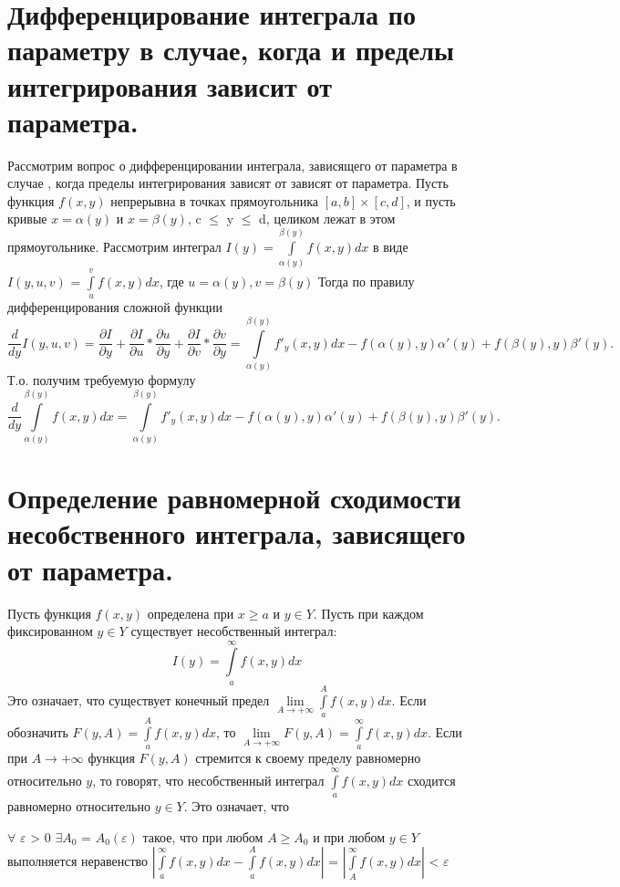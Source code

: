 \documentclass[12pt, a4paper]{article}
\begin{document}
\section{Дифференцирование интеграла по параметру в случае, когда и пределы интегрирования зависит от параметра.}
Рассмотрим вопрос о дифференцировании интеграла, зависящего от параметра в случае
, когда пределы интегрирования зависят от зависят от параметра. Пусть функция
$f(x, y)$ непрерывна в точках прямоугольника $[a, b] \times [c, d]$, и пусть
кривые $x = \alpha(y)$ и $x = \beta(y)$, c $\leq$ y $\leq$ d, целиком лежат
в этом прямоугольнике. Рассмотрим интеграл $I(y) = \int\limits_{\alpha(y)}^{\beta(y)}f(x, y)dx$ 
в виде $I(y, u, v)$ = $\int\limits_u^v f(x, y)dx$, где $u = \alpha(y), v = \beta(y)$ 
Тогда по правилу дифференцирования сложной функции 
\[
    \frac{d}{dy}I(y, u, v) = \frac{\partial I}{\partial y} + 
    \frac{\partial I}{\partial u} * \frac{\partial u}{\partial y} + 
    \frac{\partial I}{\partial v} *  \frac{\partial v}{\partial y}  = 
    \int\limits_{\alpha(y)}^{\beta(y)}f'_y(x, y)dx - f(\alpha(y), y)\alpha'(y) + 
    f(\beta(y), y)\beta'(y).
\]
Т.о. получим требуемую формулу
\[
    \frac{d}{dy}\int\limits_{\alpha(y)}^{\beta(y)}f(x, y)dx = 
    \int\limits_{\alpha(y)}^{\beta(y)}f'_y(x, y)dx - f(\alpha(y), y)\alpha'(y) + 
    f(\beta(y), y)\beta'(y).
\]

\section{Определение равномерной сходимости несобственного интеграла, зависящего от параметра.}
Пусть функция $f(x, y)$ определена при $x \geq a$ и $y \in Y$.
Пусть при каждом фиксированном $y \in Y$ существует несобственный интеграл:
\[
    I(y) = \int\limits_a^{\infty} f(x, y)dx
\]
Это означает, что существует конечный предел $\lim\limits_{A \to +\infty}
\int\limits_a^A f(x, y)dx$.
Если обозначить $F(y, A) = \int\limits_a^A f(x, y)dx$, то 
$\lim\limits_{A \to +\infty}F(y, A) = \int\limits_a^{\infty} f(x, y)dx$.
Если при $A \to +\infty$ функция $F(y, A)$ стремится к своему пределу равномерно
относительно $y$, то говорят, что несобственный интеграл $\int\limits_a^{\infty} f(x, y)dx$
сходится равномерно относительно $y \in Y$.
Это означает, что

    $\forall$ $\varepsilon$ > 0 $\exists A_0$ = $A_0(\varepsilon)$ такое, что 
при любом  $A \geq A_0$ и при любом $y \in Y$ выполняется неравенство
    $|\int\limits_a^{\infty} f(x, y)dx - \int\limits_a^A f(x, y)dx |$  = 
    $|\int\limits_A^{\infty} f(x, y)dx|$ < $\varepsilon$
\end{document}
